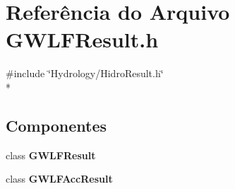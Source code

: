 \section{Referência do Arquivo G\+W\+L\+F\+Result.\+h}
\label{_g_w_l_f_result_8h}
{\ttfamily \#include \char`\"{}Hydrology/\+Hidro\+Result.\+h\char`\"{}}\\*
\subsection*{Componentes}
\begin{DoxyCompactItemize}
\item 
class {\bf G\+W\+L\+F\+Result}
\item 
class {\bf G\+W\+L\+F\+Acc\+Result}
\end{DoxyCompactItemize}
